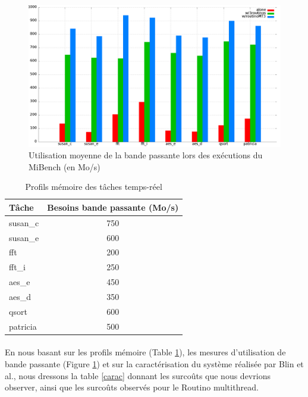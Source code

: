 \begin{figure}
\centering
\includegraphics[scale=0.285]{include/bandwidth.png}
\caption{Utilisation moyenne de la bande passante lors des exécutions du
 MiBench (en Mo/s)}
\label{bandwidth}
\end{figure}

\begin{table}[H]
\centering
\begin{tabular}{l|c}
Tâche & Besoins bande passante (Mo/s)\\
\hline
susan\_c & 750\\
susan\_e & 600\\
fft      & 200\\
fft\_i   & 250\\
aes\_e   & 450\\
aes\_d   & 350\\
qsort    & 600\\
patricia & 500\\
\end{tabular}
\caption{Profils mémoire des tâches temps-réel}
\label{measures}
\end{table}

\paragraph{}
En nous basant sur les profils mémoire (Table \ref{measures}), les
mesures d'utilisation de bande passante (Figure \ref{bandwidth}) et sur la
caractérisation du système réalisée par Blin et al.\cite{blin_protecting_2015},
nous dressons la table \ref{carac} donnant les surcoûts que nous devrions
observer, ainsi que les surcoûts observés pour le Routino multithread.

